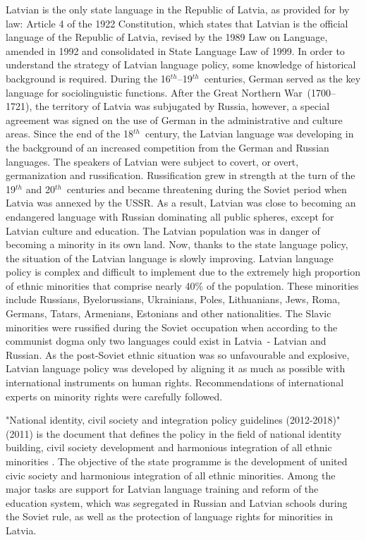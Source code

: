 \begin{multicols}{2}
Latvian is the only state language in the Republic of Latvia, as provided for by law: Article 4 of the 1922 Constitution, which states that Latvian is the official language of the Republic of Latvia, revised by the 1989 Law on Language, amended in 1992 and consolidated in State Language Law of 1999.
In order to understand the strategy of Latvian language policy, some knowledge of historical background is required.
During the 16${}^{th}$--19${}^{th}$~centuries, German served as the key language for sociolinguistic functions.
After the Great Northern War~(1700--1721), the territory of Latvia was subjugated by Russia, however, a special agreement was signed on the use of German in the administrative and culture areas.
Since the end of the 18${}^{th}$~century, the Latvian language was developing in the background of an increased competition from the German and Russian languages.
The speakers of Latvian were subject to covert, or overt, germanization and russification.
Russification grew in strength at the turn of the 19${}^{th}$ and 20${}^{th}$~centuries and became threatening during the Soviet period when Latvia was annexed by the USSR.
As a result, Latvian was close to becoming an endangered language with Russian dominating all public spheres, except for Latvian culture and education.
The Latvian population was in danger of becoming a minority in its own land.
Now, thanks to the state language policy, the situation of the Latvian language is slowly improving.
Latvian language policy is complex and difficult to implement due to the extremely high proportion of ethnic minorities that comprise nearly 40\% of the population.
These minorities include Russians, Byelorussians, Ukrainians, Poles, Lithuanians, Jews, Roma, Germans, Tatars, Armenians, Estonians and other nationalities.
The Slavic minorities were russified during the Soviet occupation when according to the communist dogma only two languages could exist in Latvia~- Latvian and Russian.
As the post-Soviet ethnic situation was so unfavourable and explosive, Latvian language policy was developed by aligning it as much as possible with international instruments on human rights.
Recommendations of international experts on minority rights were carefully followed. 

"National identity, civil society and integration policy guidelines (2012-2018)" (2011) is the document that defines the policy in the field of national identity building, civil society development  and harmonious integration of all ethnic minorities \cite{Meta3}.
The objective of the state programme is the development of united civic society and harmonious integration of all ethnic minorities. 
Among the major tasks are support for Latvian language training and reform of the education system, which was segregated in Russian and Latvian schools during the Soviet rule, as well as the protection of language rights for minorities in Latvia.


\end{multicols}

